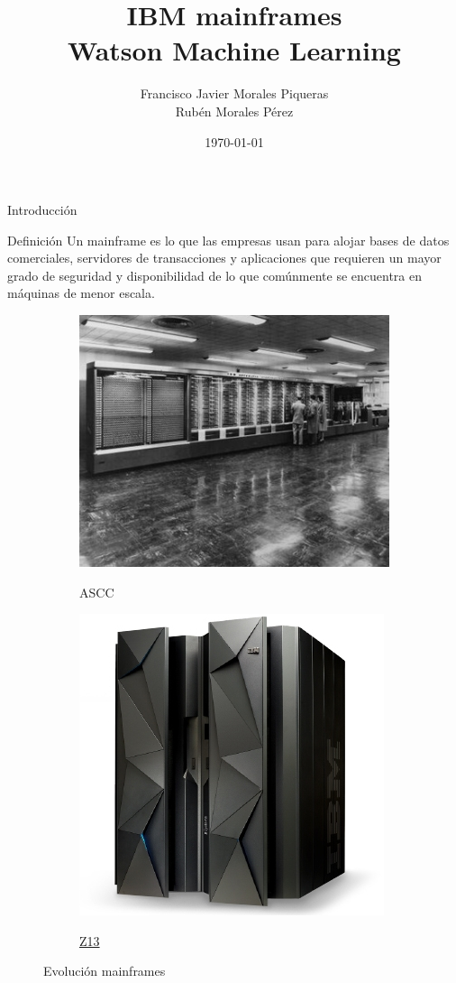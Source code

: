 \documentclass[compress]{beamer}
\title{IBM mainframes \\ Watson Machine Learning}
\author{Francisco Javier Morales Piqueras \\ Rubén Morales Pérez}
\date{\today}
\begin{document}
\begin{frame}
\titlepage
\end{frame}

\begin{frame}{Introducción}
	\begin{block}{Definición}
		Un mainframe es lo que las empresas usan para alojar bases de datos comerciales, servidores de transacciones y aplicaciones que requieren un mayor grado de seguridad y disponibilidad de lo que comúnmente se encuentra en máquinas de menor escala.
	\end{block}

	\begin{figure}[H]
		\centering
		\begin{subfigure}{.5\textwidth}
			\centering
			\href{https://www-03.ibm.com/ibm/history/exhibits/markI/markI_intro.html}{		\includegraphics[width=.75\linewidth]{./Imagenes/ascc.jpg}}
			\caption{ASCC}
			\label{fig:ascc}
		\end{subfigure}%
		\begin{subfigure}{.5\textwidth}
			\centering
			\href{https://www-03.ibm.com/systems/z/hardware/z13.html}{\includegraphics[width=.65\linewidth]{./Imagenes/z13.jpg}}
			\caption{\href{https://www-03.ibm.com/systems/z/}{Z13}}
			\label{fig:z13}
		\end{subfigure}
		\caption{Evolución mainframes}
	\end{figure}
\end{frame}
\end{document}
